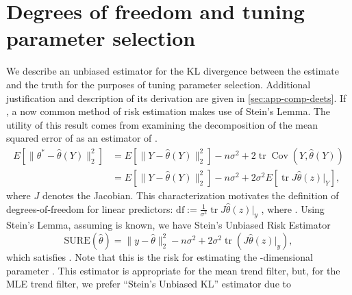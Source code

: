 \documentclass[ejs,noshowframe]{imsart}
\theoremstyle{plain}
\newtheorem{lemma}[theorem]{Lemma}
\theoremstyle{definition}
\newcommand{\snorm}[1]{\lVert #1 \rVert}
\newcommand{\R}{\mathbb{R}}
\newcommand{\E}{E}
\newcommand{\Expect}[1]{\E\left[#1\right]}
\renewcommand{\hat}{\widehat}
\DeclareMathOperator*{\trace}{tr}
\DeclareMathOperator*{\Cov}{Cov}
\begin{document}
\section{Degrees of freedom and tuning parameter selection}
\label{sec:tuning-param-select}

We describe an unbiased estimator for the KL divergence
between the estimate and the truth for the purposes of tuning parameter
selection. Additional justification and description of its derivation are given
in \autoref{sec:app-comp-deets}.
If , a now common method of risk
estimation makes use of Stein's Lemma.
The utility of this result comes from examining the decomposition of
the mean squared error of \smash{$\hat\theta(Y)$} as an estimator of 
\smash{$\theta^*$}.
\begin{align}
	\label{eq:9}
	\Expect{\snorm{\theta^*-\hat\theta(Y)}_2^2}
	&= \Expect{\snorm{Y-\hat\theta(Y)}_2^2} -n\sigma^2 + 2
	\trace\Cov(Y,\hat\theta(Y))\\
	&= \Expect{\snorm{Y-\hat\theta(Y)}_2^2} -n\sigma^2 + 2\sigma^2
	\Expect{\trace J\hat\theta(z) \big\vert_Y},
\end{align}
where $J$ denotes the Jacobian.
This characterization motivates the definition of degrees-of-freedom
for linear predictors: $\textrm{df} :=\frac{1}{\sigma^2} \trace
J\hat\theta(z)\big\vert_y$ \citep{Efron1986}, where 
\smash{$\hat\theta(y)=Hy$}. Using
Stein's Lemma, assuming  is known, we have Stein's Unbiased
Risk Estimator
\begin{equation}
	\label{eq:10}
	\mathrm{SURE}(\hat\theta) = \snorm{y-\hat\theta}_2^2 -n\sigma^2 + 
	2\sigma^2\trace\left( J\hat\theta(z) \big\vert_y\right), 
\end{equation}
which satisfies \smash{$\E[\textrm{SURE}(\hat\theta)] =
\E\snorm{\theta^*-\hat\theta(Y)}_2^2$}. 
Note that this is the risk for estimating the -dimensional parameter
\smash{$\theta^*$}. This estimator is appropriate for the mean trend filter,
but, for the MLE trend filter, we prefer ``Stein's Unbiased KL'' estimator due to 
\end{document}
